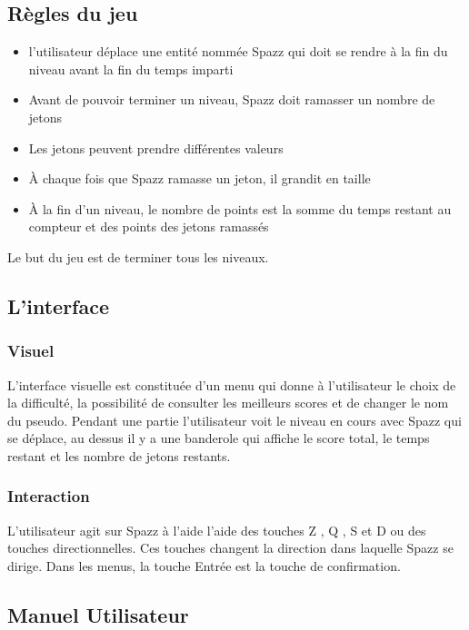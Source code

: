 \documentclass[a4paper,11pt]{article}
\begin{document}
\subsection{Règles du jeu}
\begin{itemize}[label = $\bullet$]
	\item l'utilisateur déplace une entité nommée Spazz qui doit se rendre à la fin du niveau avant la fin du temps imparti
	\item Avant de pouvoir terminer un niveau, Spazz doit ramasser un nombre de jetons
	\item Les jetons peuvent prendre différentes valeurs
	\item À chaque fois que Spazz ramasse un jeton, il grandit en taille
	\item À la fin d'un niveau, le nombre de points est la somme du temps restant au compteur et des points des jetons ramassés
\end{itemize}

Le but du jeu est de terminer tous les niveaux.

\subsection{L'interface}

\subsubsection{Visuel}

L'interface visuelle est constituée d'un menu qui donne à l'utilisateur le choix de la difficulté, la possibilité de consulter les meilleurs scores et de changer le nom du pseudo.
Pendant une partie l'utilisateur voit le niveau en cours avec Spazz qui se déplace, au dessus il y a une banderole qui affiche le score total, le temps restant et les nombre de jetons restants.

\subsubsection{Interaction}

L'utilisateur agit sur Spazz à l'aide l'aide des touches Z , Q , S et D ou des touches directionnelles. Ces touches changent la direction dans laquelle Spazz se dirige.
Dans les menus, la touche Entrée est la touche de confirmation.

\subsection{Manuel Utilisateur}
\end{document}
